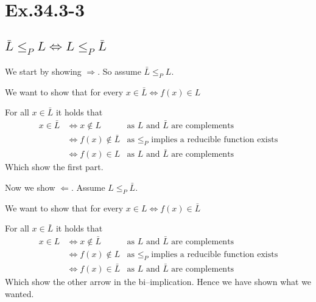 \section*{Ex.34.3-3}
\subsection*{ $\bar{L}\leq_P L \Leftrightarrow L \leq_P \bar{L}$}

We start by showing $\Rightarrow$. So assume $\bar{L}\leq_P L$.

We want to show that for every $x\in \bar{L} \Leftrightarrow  f(x) \in L$

For all $x\in \bar{L}$ it holds that
\begin{align*}
x\in \bar{L} & \Leftrightarrow x \not\in L 					&\text{as $L$ and $\bar{L}$ are complements}\\
						 & \Leftrightarrow f(x) \not\in \bar{L} &\text{as $\leq_P$ implies a reducible function exists}\\
						 & \Leftrightarrow f(x) \in L 					&\text{as $L$ and $\bar{L}$ are complements}
\end{align*}
Which show the first part.

Now we show $\Leftarrow$. Assume $L \leq_P \bar{L}$.

We want to show that for every $x\in L \Leftrightarrow  f(x) \in \bar{L}$

For all $x\in \bar{L}$ it holds that
\begin{align*}
x\in L       & \Leftrightarrow x \not\in \bar{L} 					&\text{as $L$ and $\bar{L}$ are complements}\\
						 & \Leftrightarrow f(x) \not\in L  &\text{as $\leq_P$ implies a reducible function exists}\\
						 & \Leftrightarrow f(x) \in \bar{L} 					&\text{as $L$ and $\bar{L}$ are complements}
\end{align*}
Which show the other arrow in the bi--implication. Hence we have shown what we wanted.